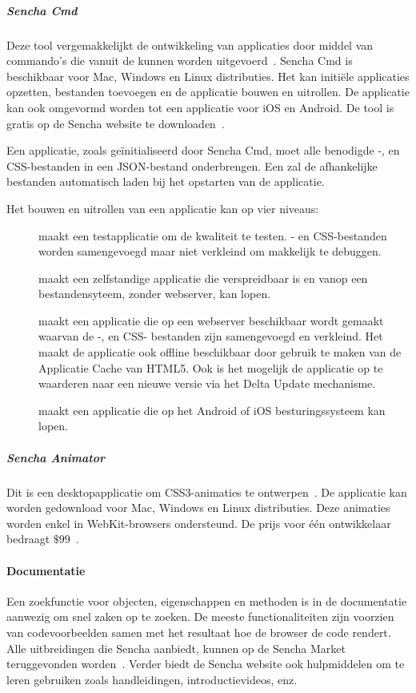 \subparagraph{Sencha Cmd}
Deze tool vergemakkelijkt de ontwikkeling van \st{} applicaties door middel van commando's die vanuit de  kunnen worden uitgevoerd~\cite{Sencha2012}.
Sencha Cmd is beschikbaar voor Mac, Windows en Linux distributies.
Het kan initiële applicaties opzetten,  bestanden toevoegen en de applicatie bouwen en uitrollen.
De applicatie kan ook omgevormd worden tot een  applicatie voor iOS en Android.
De tool is gratis op de Sencha website te downloaden~\cite{Inc.}.

Een applicatie,  zoals geïnitialiseerd door Sencha Cmd,  moet alle benodigde \js-, en CSS-bestanden in een JSON-bestand onderbrengen.
Een  zal de afhankelijke bestanden automatisch laden bij het opstarten van de applicatie.

Het bouwen en uitrollen van een applicatie kan op vier niveaus:
\begin{description}
  \item [] maakt een testapplicatie om de kwaliteit te testen.  \js- en CSS-bestanden worden samengevoegd maar niet verkleind om makkelijk te debuggen.
  \item [] maakt een zelfstandige applicatie die verspreidbaar is en vanop een bestandensyteem,  zonder webserver,  kan lopen.
  \item [] maakt een applicatie die op een webserver beschikbaar wordt gemaakt waarvan de \js-, en CSS- bestanden zijn samengevoegd en verkleind.  Het maakt de applicatie ook offline beschikbaar door gebruik te maken van de Applicatie Cache van HTML5.  Ook is het mogelijk de applicatie op te waarderen naar een nieuwe versie via het Delta Update mechanisme.
  \item [] maakt een  applicatie die op het Android of iOS besturingssysteem kan lopen.
\end{description}

\subparagraph{Sencha Animator}
Dit is een desktopapplicatie om CSS3-animaties te ontwerpen~\cite{Sencha2012b}.  
De applicatie kan worden gedownload voor Mac, Windows en Linux distributies.
Deze animaties worden enkel in WebKit-browsers ondersteund.
De prijs voor één ontwikkelaar bedraagt $\$99$~\cite{Inc.}.

\paragraph{Documentatie}
Een zoekfunctie voor objecten,  eigenschappen en methoden is in de documentatie aanwezig om snel zaken op te zoeken.  
De meeste functionaliteiten zijn voorzien van codevoorbeelden samen met het resultaat hoe de browser de code rendert.  
Alle uitbreidingen die Sencha aanbiedt, kunnen op de Sencha Market teruggevonden worden~\cite{Sencha2013}.
Verder biedt de Sencha website ook hulpmiddelen om \st{} te leren gebruiken zoals handleidingen, introductievideos, enz.

